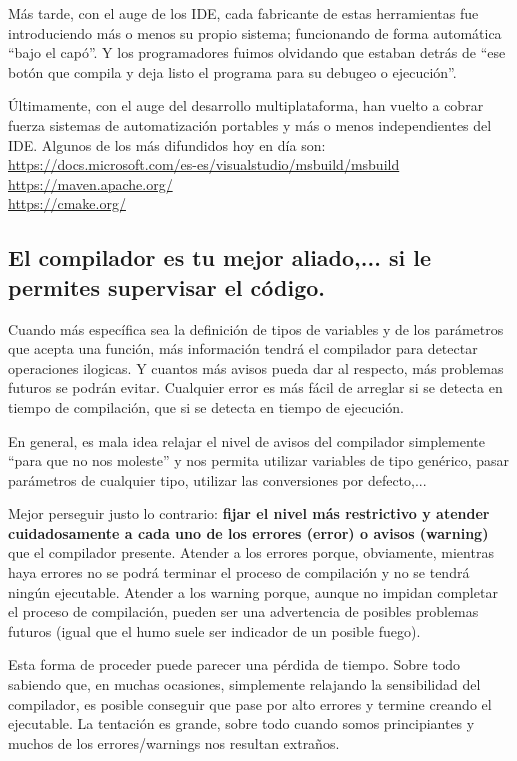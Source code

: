 \documentclass[spanish,12pt,a4paper,final,oneside]{book}
\begin{document}
Más tarde, con el auge de los IDE, cada fabricante de estas herramientas fue introduciendo más o menos su propio sistema; funcionando de forma automática ``bajo el capó''. Y los programadores fuimos olvidando que estaban detrás de ``ese botón que compila y deja listo el programa para su debugeo o ejecución''.

Últimamente, con el auge del desarrollo multiplataforma, han vuelto a cobrar fuerza sistemas de automatización portables y más o menos independientes del IDE. Algunos de los más difundidos hoy en día son:
\\ \url{https://docs.microsoft.com/es-es/visualstudio/msbuild/msbuild}
\\ \url{https://maven.apache.org/}
\\ \url{https://cmake.org/}



\subsection{El compilador es tu mejor aliado,... si le permites supervisar el código.} 
Cuando más específica sea la definición de tipos de variables y de los parámetros que acepta una función, más información tendrá el compilador para detectar operaciones ilogicas. Y cuantos más avisos pueda dar al respecto, más problemas futuros se podrán evitar. Cualquier error es más fácil de arreglar si se detecta en tiempo de compilación, que si se detecta en tiempo de ejecución.

En general, es mala idea relajar el nivel de avisos del compilador simplemente ``para que no nos moleste'' y nos permita utilizar variables de tipo genérico, pasar parámetros de cualquier tipo, utilizar las conversiones por defecto,... 

Mejor perseguir justo lo contrario: \textbf{fijar el nivel más restrictivo y atender cuidadosamente a cada uno de los errores (error) o avisos (warning)} que el compilador presente. Atender a los errores porque, obviamente, mientras haya errores no se podrá terminar el proceso de compilación y no se tendrá ningún ejecutable. Atender a los warning porque, aunque no impidan completar el proceso de compilación, pueden ser una advertencia de posibles problemas futuros (igual que el humo suele ser indicador de un posible fuego).

Esta forma de proceder puede parecer una pérdida de tiempo. Sobre todo sabiendo que, en muchas ocasiones, simplemente relajando la sensibilidad del compilador, es posible conseguir que pase por alto errores y termine creando el ejecutable. La tentación es grande, sobre todo cuando somos principiantes y muchos de los errores/warnings nos resultan extraños.
\end{document}
